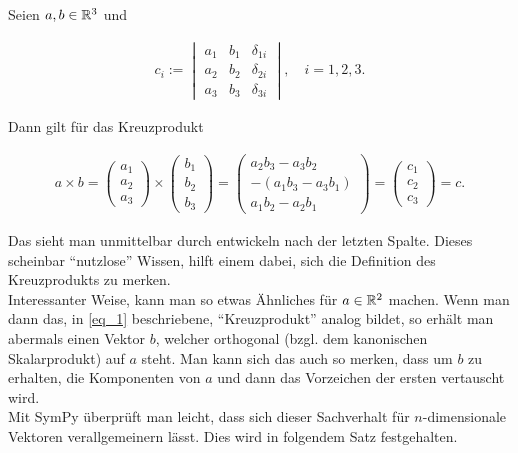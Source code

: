 \begin{remark*}

Seien $a, b \in \mathbb{R}^3$ und

\begin{align} \label{eq_1}
  c_i
  :=
  \begin{vmatrix}
    a_1 & b_1 & \delta_{1 i} \\
    a_2 & b_2 & \delta_{2 i} \\
    a_3 & b_3 & \delta_{3 i}
  \end{vmatrix},
  \quad
  i = 1, 2, 3.
\end{align}

Dann gilt für das Kreuzprodukt

\begin{align*}
  a \times b
  =
  \begin{pmatrix}
    a_1 \\
    a_2 \\
    a_3
  \end{pmatrix}
  \times
  \begin{pmatrix}
  b_1 \\
  b_2 \\
  b_3
  \end{pmatrix}
  =
  \begin{pmatrix}
      a_2 b_3 - a_3 b_2 \\
    -(a_1 b_3 - a_3 b_1) \\
      a_1 b_2 - a_2 b_1
  \end{pmatrix}
  =
  \begin{pmatrix}
    c_1 \\
    c_2 \\
    c_3
  \end{pmatrix}
  = c.
\end{align*}

Das sieht man unmittelbar durch entwickeln nach der letzten Spalte.
Dieses scheinbar \enquote{nutzlose} Wissen, hilft einem dabei, sich die Definition des Kreuzprodukts zu merken. \\

Interessanter Weise, kann man so etwas Ähnliches für $a \in \mathbb{R}^2$ machen.
Wenn man dann das, in \eqref{eq_1} beschriebene, \enquote{Kreuzprodukt} analog bildet, so erhält man abermals einen Vektor $b$, welcher orthogonal (bzgl. dem kanonischen Skalarprodukt) auf $a$ steht.
Man kann sich das auch so merken, dass um $b$ zu erhalten, die Komponenten von $a$ und dann das Vorzeichen der ersten vertauscht wird. \\

Mit SymPy überprüft man leicht, dass sich dieser Sachverhalt für $n$-dimensionale Vektoren verallgemeinern lässt.
Dies wird in folgendem Satz festgehalten.

\end{remark*}
